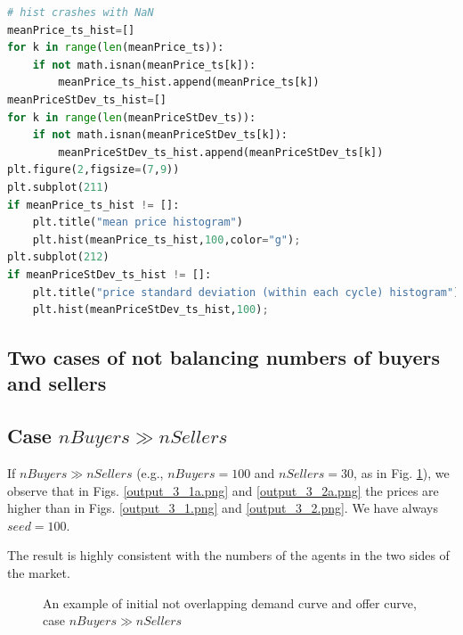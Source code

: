 \documentclass[12pt]{report}
\begin{document}
\begin{lstlisting}[language=Python, caption=The unstructured version, basicstyle=\ttfamily\footnotesize]
# hist crashes with NaN
meanPrice_ts_hist=[]
for k in range(len(meanPrice_ts)): 
    if not math.isnan(meanPrice_ts[k]):
        meanPrice_ts_hist.append(meanPrice_ts[k])
meanPriceStDev_ts_hist=[]
for k in range(len(meanPriceStDev_ts)): 
    if not math.isnan(meanPriceStDev_ts[k]):
        meanPriceStDev_ts_hist.append(meanPriceStDev_ts[k])
plt.figure(2,figsize=(7,9))
plt.subplot(211)
if meanPrice_ts_hist != []:
    plt.title("mean price histogram")
    plt.hist(meanPrice_ts_hist,100,color="g");
plt.subplot(212)
if meanPriceStDev_ts_hist != []:
    plt.title("price standard deviation (within each cycle) histogram")
    plt.hist(meanPriceStDev_ts_hist,100);
\end{lstlisting}




\begin{appendices}
\section{Two cases of not balancing numbers of buyers and sellers}\label{Two cases of not balancing numbers of buyers and sellers}
\thispagestyle{fancy}

\subsection{Case $nBuyers \gg nSellers$}
If $nBuyers \gg nSellers$ (e.g., $nBuyers=100$ and $nSellers=30$, as in Fig. \ref{output_2_0a.png}), we observe that in Figs. \ref{output_3_1a.png} and \ref{output_3_2a.png} the prices are higher than in Figs. \ref{output_3_1.png} and \ref{output_3_2.png}. We have always $seed=100$.

The result is highly consistent with the numbers of the agents in the two sides of the market.

\begin{figure}[htbp]
\begin{center}
\caption{An example of initial not overlapping demand curve and offer curve, case $nBuyers \gg nSellers$}
\label{output_2_0a.png}
\end{center}
\end{figure}


\end{appendices}
\end{document}

